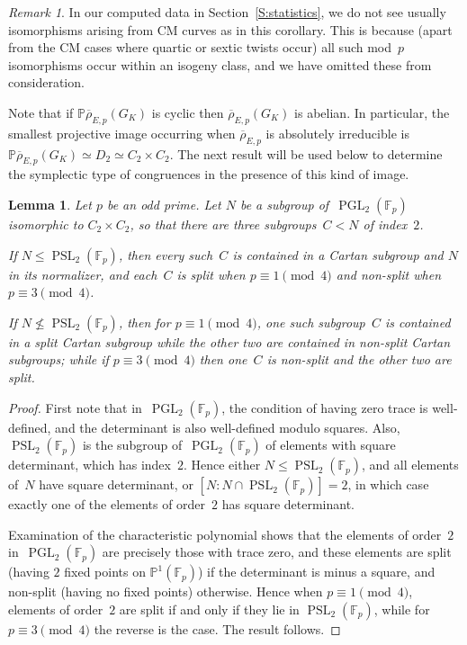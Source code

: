 \documentclass[12pt, reqno]{amsart}
\newcommand{\Fp}{\mathbb{F}_p}
\newcommand{\PP}{\mathbb{P}}
\newcommand{\rhobar}{{\overline{\rho}}}
\newcommand{\PGL}{\operatorname{PGL}}
\newcommand{\PSL}{\operatorname{PSL}}
\numberwithin{equation}{section}
\newtheorem{lemma}[theorem]{Lemma}
\theoremstyle{definition}
\theoremstyle{remark}
\newtheorem{remark}[theorem]{Remark}
\begin{document}
\begin{remark}
In our computed data in Section~\ref{S:statistics}, we do not see
usually isomorphisms arising from CM curves as in this corollary. This
is because (apart from the CM cases where quartic or sextic twists
occur) all such mod~$p$ isomorphisms occur within an isogeny class,
and we have omitted these from consideration.
\end{remark}

Note that if $\PP\rhobar_{E,p} (G_K)$ is cyclic  then 
$\rhobar_{E,p} (G_K)$ is abelian. 
In particular, the smallest projective image occurring when $\rhobar_{E,p}$ is absolutely irreducible is 
$\PP\rhobar_{E,p} (G_K) \simeq D_2 \simeq C_2 \times C_2$. The next
result will be used below to determine the symplectic type of
congruences in the presence of this kind of image.

\begin{lemma}\label{L:C2xC2}
Let $p$ be an odd prime.  Let $N$ be a subgroup of~$\PGL_2(\Fp)$
isomorphic to $C_2\times C_2$, so that there are three subgroups~$C< N$
of index~$2$.

If $N\le\PSL_2(\Fp)$, then every such~$C$ is contained in a Cartan
subgroup and $N$ in its normalizer, and each~$C$ is split when
$p\equiv1\pmod4$ and non-split when $p\equiv3\pmod4$.

If $N\not\le\PSL_2(\Fp)$, then for $p\equiv1\pmod4$, one such
subgroup~$C$ is contained in a split Cartan subgroup while the other
two are contained in non-split Cartan subgroups; while if
$p\equiv3\pmod4$ then one~$C$ is non-split and the other two are
split.
\end{lemma}

\begin{proof}
  First note that in~$\PGL_2(\Fp)$, the condition of having zero
  trace is well-defined, and the determinant is also well-defined
  modulo squares.  Also, $\PSL_2(\Fp)$ is the subgroup of~$\PGL_2(\Fp)$ of elements with
  square determinant, which has index~$2$.  Hence either
  $N\le\PSL_2(\Fp)$, and all elements of~$N$ have square determinant,
  or $[N:N\cap\PSL_2(\Fp)]=2$, in which case exactly one of the
  elements of order~$2$ has square determinant.

  Examination of the characteristic polynomial shows that the elements
  of order~$2$ in~$\PGL_2(\Fp)$ are precisely those with trace zero,
  and these elements are split (having $2$ fixed points on
  $\PP^1(\Fp)$) if the determinant is minus a square, and non-split
  (having no fixed points) otherwise.  Hence when $p\equiv1\pmod4$,
  elements of order~$2$ are split if and only if they lie in
  $\PSL_2(\Fp)$, while for $p\equiv3\pmod4$ the reverse is the case.
  The result follows.
\end{proof}
\end{document}
